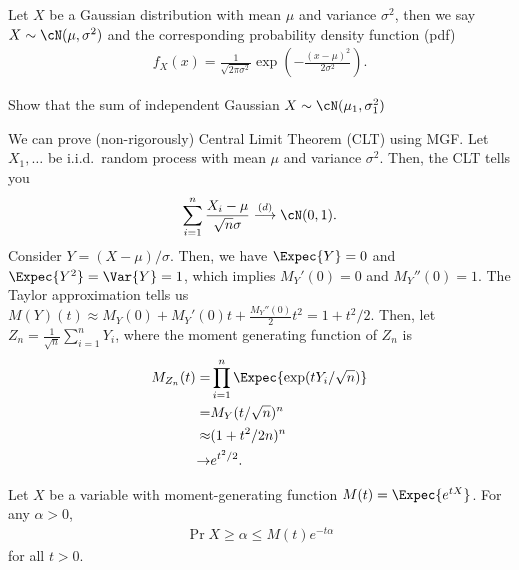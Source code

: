 \documentclass{article}
\begin{document}
\begin{definition}
    Let $X$ be a Gaussian distribution with mean $\mu$ and variance $\sigma^2$, then we say $X\sim\cN(\mu, \sigma^2)$ and the corresponding probability density function (pdf)
    \begin{align}
        f_X(x) = \frac{1}{\sqrt{2\pi \sigma^2}} \exp\left(-\frac{(x-\mu)^2}{2\sigma^2}\right).
    \end{align}
\end{definition}

\begin{exercise}
    Show that the sum of independent Gaussian $X\sim\cN(\mu_1, \sigma_1^2)$
\end{exercise}

\begin{remark}
    We can prove (non-rigorously) Central Limit Theorem (CLT) using MGF.
    Let $X_1,\dots $ be i.i.d.~random process with mean $\mu$ and variance $\sigma^2$.
    Then, the CLT tells you
    \begin{align}
        \sum_{i=1}^n \frac{X_i-\mu}{\sqrt{n}\sigma} \stackrel{(d)}{\longrightarrow } \cN(0, 1).
    \end{align}
    Consider $Y = (X-\mu)/\sigma$.
    Then, we have $\Expec{Y} = 0$ and $\Expec{Y^2} = \Var{Y} = 1$, which implies $M_Y'(0) = 0$ and $M_Y''(0) = 1$.
    The Taylor approximation tells us $M(Y)(t) \approx M_Y(0) + M_Y'(0)t + \frac{M_Y''(0)}{2}t^2 = 1 + t^2/2$.
    Then, let $Z_n = \frac{1}{\sqrt{n}}\sum_{i=1}^n Y_i$, where the moment generating function of $Z_n$ is
    \begin{align}
        M_{Z_n}(t) =& \prod_{i=1}^n \Expec{\exp(tY_i/\sqrt{n})}\\
        =& M_Y(t/\sqrt{n})^n\\
        \approx& (1 + t^2/2n)^n\\
        \rightarrow& e^{t^2/2}.
    \end{align}
\end{remark}

\begin{theorem}
Let $X$ be a variable with moment-generating function $M(t) = \Expec{e^{tX}}$.
For any $\alpha > 0$,
\begin{align}
    \Pr{X\geq \alpha} \leq M(t) e^{-t\alpha}
\end{align}
for all $t>0$.
\end{theorem}
\end{document}
